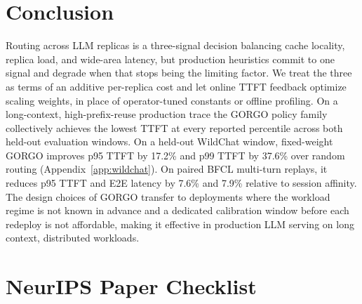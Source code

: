 \documentclass{article}
\newif\ifshowchecklist\showchecklistfalse
\begin{document}
\section{Conclusion}
\label{sec:conclusion}

Routing across LLM replicas is a three-signal decision balancing cache locality, replica
load, and wide-area latency, but production heuristics commit to one signal and
degrade when that stops being the limiting factor. We treat the three as
terms of an additive per-replica cost and let online TTFT feedback optimize 
scaling weights, in place of operator-tuned constants or offline profiling. On a
long-context, high-prefix-reuse production trace the GORGO policy family
collectively achieves the lowest TTFT at every reported percentile across both
held-out evaluation windows. On a held-out WildChat window,
fixed-weight GORGO improves p95 TTFT by 17.2\% and p99 TTFT by 37.6\% over
random routing (Appendix~\ref{app:wildchat}). On paired BFCL multi-turn
replays, it reduces p95 TTFT and E2E latency by 7.6\% and 7.9\% relative to session
affinity. The design choices of GORGO transfer to
deployments where the workload regime is not known in advance and a dedicated
calibration window before each redeploy is not affordable, making it effective in production LLM serving on long context, distributed workloads. 




\ifshowchecklist
\newpage

\section*{NeurIPS Paper Checklist}
\end{document}
